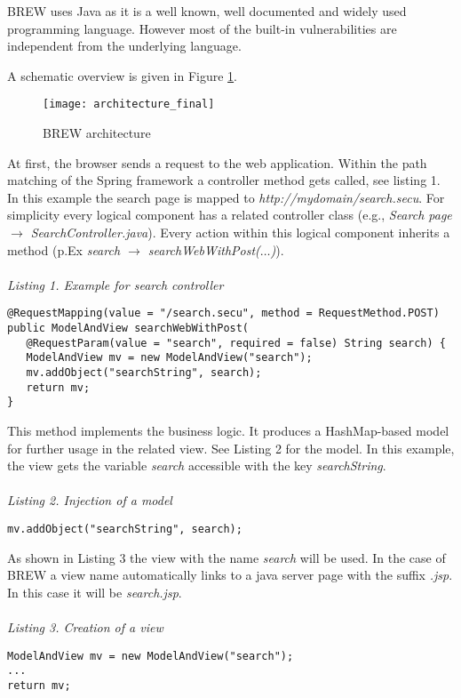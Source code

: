 \documentclass{llncs}
\begin{document}
BREW uses Java as it is a well known, well documented and widely used programming language.
However most of the built-in vulnerabilities are independent from the underlying language.

A schematic overview is given in Figure \ref{fig:architecture}.

\begin{figure}
\centering
\texttt{[image: architecture\_final]}
\caption{BREW architecture} 
\label{fig:architecture}
\end{figure}

At first, the browser sends a request to the web application. Within the path matching of the Spring framework a controller method gets called, see listing 1. In this example the search page is mapped to {\em http://mydomain/search.secu}. For simplicity every logical component has a related controller class (e.g., {\em Search page $\rightarrow$ SearchController.java}). Every action within this logical component inherits a method (p.Ex {\em search $\rightarrow$ searchWebWithPost($\dots$)}).
\\\\
\noindent
{\it Listing 1. Example for search controller }
\begin{small}
\begin{verbatim}
@RequestMapping(value = "/search.secu", method = RequestMethod.POST)
public ModelAndView searchWebWithPost(
   @RequestParam(value = "search", required = false) String search) {
   ModelAndView mv = new ModelAndView("search");
   mv.addObject("searchString", search);
   return mv;
}
\end{verbatim}
\end{small}


This method implements the business logic. It produces a HashMap-based model for further usage in the related view. See Listing 2 for the model. In this example, the view gets the variable {\em search} accessible with the key {\em searchString}.
\\\\
\noindent
{\it Listing 2. Injection of a model}
\begin{small}
\begin{verbatim}
mv.addObject("searchString", search);
\end{verbatim}
\end{small}

As shown in Listing 3 the view with the name {\em search} will be used.
In the case of BREW a view name automatically links to a java server page with the suffix {\em .jsp}. In this case it will be {\em search.jsp}.
\\\\
\noindent
{\it Listing 3. Creation of a view}
\begin{small}
\begin{verbatim}
ModelAndView mv = new ModelAndView("search");
...
return mv; 
\end{verbatim}
\end{small}
\end{document}
